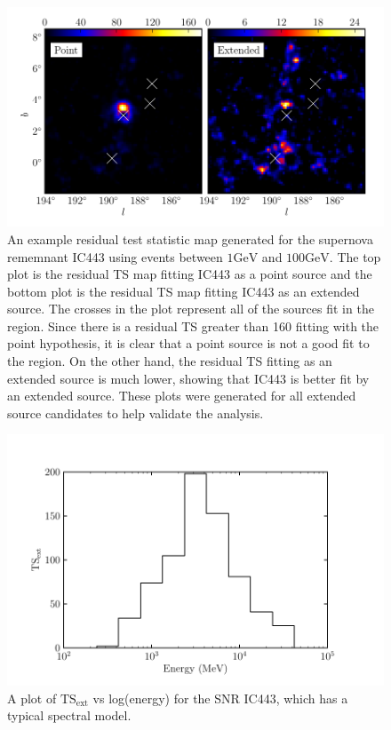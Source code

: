 \documentclass[preprint]{aastex}
\newcommand{\gev}{\text{GeV}\xspace}
\newcommand{\tsext}{{\ensuremath{\text{TS}_\text{ext}}}\xspace}
\begin{document}
\begin{figure}
  \begin{center}
  \includegraphics{ic443_plots/res_tsmap_ic443.pdf}

  \caption{An example residual test statistic map generated for the
  supernova rememnant IC443 using events between $1\gev$ and
  $100\gev$.  The top plot is the residual TS map fitting IC443
  as a point source and the bottom plot is the residual TS map fitting
  IC443 as an extended source. The crosses in the plot represent all of
  the sources fit in the region. Since there is a residual TS greater
  than 160 fitting with the point hypothesis, it is clear that a point
  source is not a good fit to the region. On the other hand,
  the residual TS fitting as an extended source is much lower, showing
  that IC443 is better fit by an extended source. These plots were generated
  for all extended source candidates to help validate the analysis.}
  \label{res_tsmaps}
  \end{center}
\end{figure}

\clearpage
\begin{figure}
  \begin{center}
    \includegraphics{ic443_plots/ic443_ts_ext_vs_energy.pdf}
    \caption{A plot of \tsext vs log(energy)
    for the SNR IC443, which has a typical spectral model.}
    \label{ts_ext_vs_energy}
  \end{center}
\end{figure}
\end{document}
